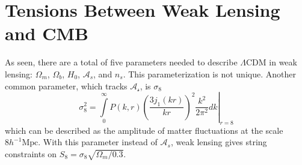 \section{Tensions Between Weak Lensing and CMB}
As seen, there are a total of five parameters needed to describe $\Lambda$CDM in weak lensing: $\Omega_m$, $\Omega_b$, $H_0$, $\mathcal{A}_s$, and $n_s$. This parameterization is not unique. Another common parameter, which tracks $\mathcal{A_s}$, is $\sigma_8$
\begin{equation}
	\sigma_8^2 = \left.\int\limits_0^\infty P(k,r)\left(\frac{3j_1(kr)}{kr}\right)^2\frac{k^2}{2\pi^2}dk\right|_{r=8}
\end{equation}
which can be described as the amplitude of matter fluctuations at the scale $8 h^{-1}\mathrm{Mpc}$. With this parameter instead of $\mathcal{A}_s$, weak lensing gives string constraints on $S_8 = \sigma_8\sqrt{\Omega_m/0.3}$. 

